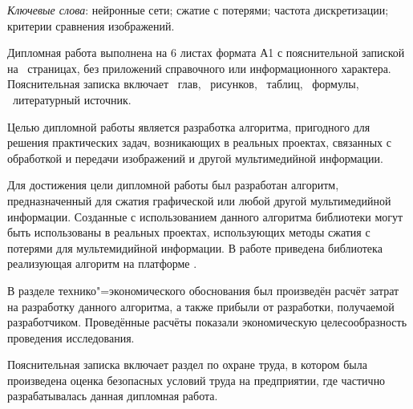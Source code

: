 \thispagestyle{empty}

\emph{Ключевые слова}: нейронные сети; сжатие с потерями; частота дискретизации; критерии сравнения изображений.

\vspace{4\parsep}

Дипломная работа выполнена на 6 листах формата А1 с пояснительной запиской на~\pageref*{LastPage} страницах, без приложений справочного или информационного характера.
Пояснительная записка включает ~глав, \totfig{}~рисунков, \tottab{}~таблиц, \toteq{}~формулы, \totref{}~литературный источник.

Целью дипломной работы является разработка алгоритма, пригодного для решения практических задач, возникающих в реальных проектах, связанных с обработкой и передачи изображений и другой мультимедийной информации.

Для достижения цели дипломной работы был разработан алгоритм, предназначенный для сжатия графической или любой другой мультимедийной информации.
Созданные с использованием данного алгоритма библиотеки могут быть использованы в реальных проектах, использующих методы сжатия с потерями для мультемидийной информации.
В работе приведена библиотека реализующая алгоритм на платформе \dotnet{}.

В разделе технико"=экономического обоснования был произведён расчёт затрат на разработку данного алгоритма, а также прибыли от разработки, получаемой разработчиком.
Проведённые расчёты показали экономическую целесообразность проведения исследования.

Пояснительная записка включает раздел по охране труда, в котором была произведена оценка безопасных условий труда на предприятии, где частично разрабатывалась данная дипломная работа.

\clearpage
